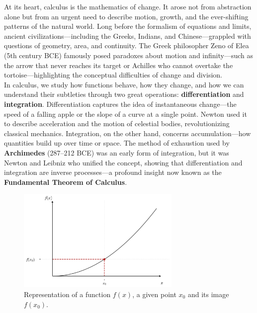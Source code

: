\documentclass{book}
\begin{document}
At its heart, calculus is the mathematics of change. It arose not from abstraction alone but from an urgent need to describe motion, growth, and the ever-shifting patterns of the natural world. Long before the formalism of equations and limits, ancient civilizations---including the Greeks, Indians, and Chinese---grappled with questions of geometry, area, and continuity. The Greek philosopher Zeno of Elea (5th century BCE) famously posed paradoxes about motion and infinity---such as the arrow that never reaches its target or Achilles who cannot overtake the tortoise---highlighting the conceptual difficulties of change and division.\\

In calculus, we study how functions behave, how they change, and how we can understand their subtleties through two great operations: \textbf{differentiation} and \textbf{integration}. Differentiation captures the idea of instantaneous change---the speed of a falling apple or the slope of a curve at a single point. Newton used it to describe acceleration and the motion of celestial bodies, revolutionizing classical mechanics. Integration, on the other hand, concerns accumulation---how quantities build up over time or space. The method of exhaustion used by \textbf{Archimedes} (287--212 BCE) was an early form of integration, but it was Newton and Leibniz who unified the concept, showing that differentiation and integration are inverse processes---a profound insight now known as the \textbf{Fundamental Theorem of Calculus}.\\

\begin{figure}[ht]
    \centering
    \includegraphics[width=0.7\textwidth]{figures/appendix/functions_point_1.png}
    \caption{Representation of a function $f(x)$, a given point $x_0$ and its image $f(x_0)$.}
    \label{fig:functions_point_1}
\end{figure}
\end{document}
